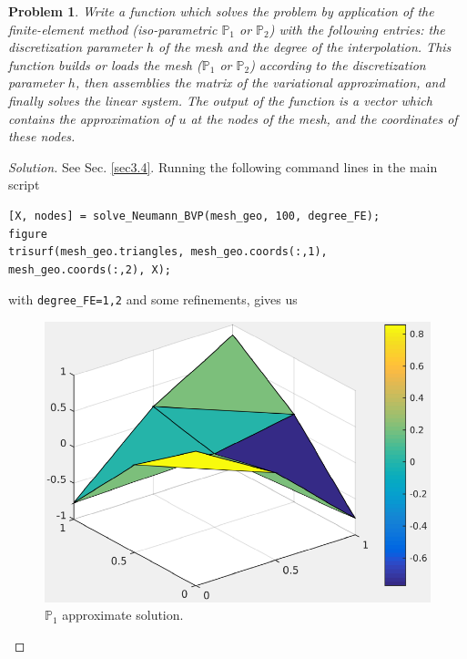\documentclass[11pt,a4paper,center,notitlepage]{article}
\numberwithin{equation}{section}
\newtheorem{prob}{Problem}[section]
\begin{document}
\begin{prob}\label{prob2.1}
Write a function which solves the problem by application of the finite-element method (iso-parametric $\mathbb{P}_1$ or $\mathbb{P}_2$) with the following entries: the discretization parameter $h$ of the mesh and the degree of the interpolation. This function builds or loads the mesh ($\mathbb{P}_1$ or $\mathbb{P}_2$) according to the discretization parameter $h$, then assemblies the matrix of the variational approximation, and finally solves the linear system. The output of the function is a vector which contains the approximation of $u$ at the nodes of the mesh, and the coordinates of these nodes.
\end{prob}

\begin{proof}[Solution]
See Sec. \ref{sec3.4}. Running the following command lines in the main script
\begin{verbatim}
[X, nodes] = solve_Neumann_BVP(mesh_geo, 100, degree_FE);
figure
trisurf(mesh_geo.triangles, mesh_geo.coords(:,1), mesh_geo.coords(:,2), X);
\end{verbatim}
with \verb|degree_FE=1,2| and some refinements, gives us 
\newpage
\begin{figure}[H]
\centering
\includegraphics[scale=0.9]{appro_solution_1_P1}
\caption{$\mathbb{P}_1$ approximate solution.}
\end{figure} 


\end{proof}
\end{document}
